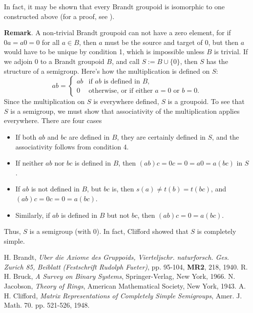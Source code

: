 \documentclass[12pt]{article}
\begin{document}
In fact, it may be shown that every Brandt groupoid is isomorphic to one constructed above (for a proof, see ).

\textbf{Remark}.  A non-trivial Brandt groupoid can not have a zero element, for if $0a=a0=0$ for all $a\in B$, then $a$ must be the source and target of $0$, but then $a$ would have to be unique by condition 1, which is impossible unless $B$ is trivial.  If we adjoin $0$ to a Brandt groupoid $B$, and call $S:=B\cup \lbrace 0\rbrace$, then $S$ has the structure of a semigroup.  Here's how the multiplication is defined on $S$: 
\begin{displaymath}
ab = \left\{
\begin{array}{ll}
ab & \textrm{if $ab$ is defined in $B$},\\
0 & \textrm{otherwise, or if either $a=0$ or $b=0$}.
\end{array}
\right.
\end{displaymath}
Since the multiplication on $S$ is everywhere defined, $S$ is a groupoid.  To see that $S$ is a semigroup, we must show that associativity of the multiplication applies everywhere.  There are four cases
\begin{itemize}
\item 
If both $ab$ and $bc$ are defined in $B$, they are certainly defined in $S$, and the associativity follows from condition 4.  
\item
If neither $ab$ nor $bc$ is defined in $B$, then $(ab)c=0c=0=a0=a(bc)$ in $S$.  
\item
If $ab$ is not defined in $B$, but $bc$ is, then $s(a)\ne t(b)=t(bc)$, and $(ab)c=0c=0=a(bc)$.  
\item
Similarly, if $ab$ is defined in $B$ but not $bc$, then $(ab)c=0=a(bc)$.
\end{itemize}
Thus, $S$ is a semigroup (with $0$).  In fact, Clifford showed that $S$ is completely simple.

\begin{thebibliography}{9}
 H. Brandt, \emph{Uber die Axiome des Gruppoids, Vierteljschr.  naturforsch. Ges. Zurich 85, Beiblatt (Festschrift Rudolph Fueter)}, pp. 95-104, {\bf MR2}, 218, 1940.
 R. H. Bruck, \emph{A Survey on Binary Systems}, Springer-Verlag, New York, 1966.
 N. Jacobson, \emph{Theory of Rings}, American Mathematical Society, New York, 1943.
 A. H. Clifford, \emph{Matrix Representations of Completely Simple Semigroups}, Amer. J. Math. 70. pp. 521-526, 1948.
\end{thebibliography}
\end{document}
